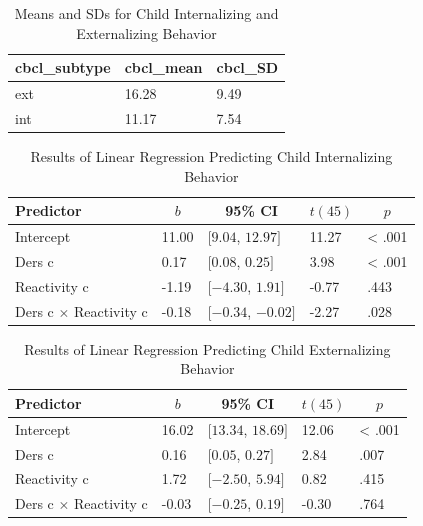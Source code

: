 \documentclass[man]{apa6}
\begin{document}
\begin{table}[tbp]
\begin{center}
\begin{threeparttable}
\caption{\label{tab:descriptives cbcl}Means and SDs for Child Internalizing and Externalizing Behavior}
\begin{tabular}{lll}
\toprule
cbcl\_subtype & \multicolumn{1}{c}{cbcl\_mean} & \multicolumn{1}{c}{cbcl\_SD}\\
\midrule
ext & 16.28 & 9.49\\
int & 11.17 & 7.54\\
\bottomrule
\end{tabular}
\end{threeparttable}
\end{center}
\end{table}

\begin{table}[tbp]
\begin{center}
\begin{threeparttable}
\caption{\label{tab:linear regression internalizing}Results of Linear Regression Predicting Child Internalizing Behavior}
\begin{tabular}{lllll}
\toprule
Predictor & \multicolumn{1}{c}{$b$} & \multicolumn{1}{c}{95\% CI} & \multicolumn{1}{c}{$t(45)$} & \multicolumn{1}{c}{$p$}\\
\midrule
Intercept & 11.00 & $[9.04$, $12.97]$ & 11.27 & < .001\\
Ders c & 0.17 & $[0.08$, $0.25]$ & 3.98 & < .001\\
Reactivity c & -1.19 & $[-4.30$, $1.91]$ & -0.77 & .443\\
Ders c $\times$ Reactivity c & -0.18 & $[-0.34$, $-0.02]$ & -2.27 & .028\\
\bottomrule
\end{tabular}
\end{threeparttable}
\end{center}
\end{table}

\begin{table}[tbp]
\begin{center}
\begin{threeparttable}
\caption{\label{tab:linear regression externalizing}Results of Linear Regression Predicting Child Externalizing Behavior}
\begin{tabular}{lllll}
\toprule
Predictor & \multicolumn{1}{c}{$b$} & \multicolumn{1}{c}{95\% CI} & \multicolumn{1}{c}{$t(45)$} & \multicolumn{1}{c}{$p$}\\
\midrule
Intercept & 16.02 & $[13.34$, $18.69]$ & 12.06 & < .001\\
Ders c & 0.16 & $[0.05$, $0.27]$ & 2.84 & .007\\
Reactivity c & 1.72 & $[-2.50$, $5.94]$ & 0.82 & .415\\
Ders c $\times$ Reactivity c & -0.03 & $[-0.25$, $0.19]$ & -0.30 & .764\\
\bottomrule
\end{tabular}
\end{threeparttable}
\end{center}
\end{table}
\end{document}
